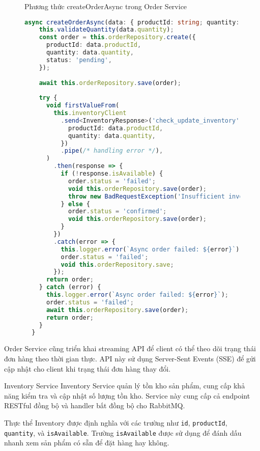 \begin{figure}[H]{Phương thức createOrderAsync trong Order Service}
  \centering
  \begin{minipage}{\textwidth}
    \begin{lstlisting}[language=Typescript, basicstyle=\scriptsize\ttfamily]
  async createOrderAsync(data: { productId: string; quantity: number }) {
    this.validateQuantity(data.quantity);
    const order = this.orderRepository.create({
      productId: data.productId,
      quantity: data.quantity,
      status: 'pending',
    });
  
    await this.orderRepository.save(order);
  
    try {
      void firstValueFrom(
        this.inventoryClient
          .send<InventoryResponse>('check_update_inventory', {
            productId: data.productId,
            quantity: data.quantity,
          })
          .pipe(/* handling error */),
      )
        .then(response => {
          if (!response.isAvailable) {
            order.status = 'failed';
            void this.orderRepository.save(order);
            throw new BadRequestException('Insufficient inventory');
          } else {
            order.status = 'confirmed';
            void this.orderRepository.save(order);
          }
        })
        .catch(error => {
          this.logger.error(`Async order failed: ${error}`);
          order.status = 'failed';
          void this.orderRepository.save;
        });
      return order;
    } catch (error) {
      this.logger.error(`Async order failed: ${error}`);
      order.status = 'failed';
      await this.orderRepository.save(order);
      return order;
    }
  }
  \end{lstlisting}
  \end{minipage}
\end{figure}

Order Service cũng triển khai streaming API để client có thể theo dõi trạng thái đơn hàng theo thời gian thực. API này sử dụng Server-Sent Events (SSE) để gửi cập nhật cho client khi trạng thái đơn hàng thay đổi.

Inventory Service
Inventory Service quản lý tồn kho sản phẩm, cung cấp khả năng kiểm tra và cập nhật số lượng tồn kho. Service này cung cấp cả endpoint RESTful đồng bộ và handler bất đồng bộ cho RabbitMQ.

Thực thể Inventory được định nghĩa với các trường như \texttt{id}, \texttt{productId}, \texttt{quantity}, và \texttt{isAvailable}. Trường \texttt{isAvailable} được sử dụng để đánh dấu nhanh xem sản phẩm có sẵn để đặt hàng hay không.

